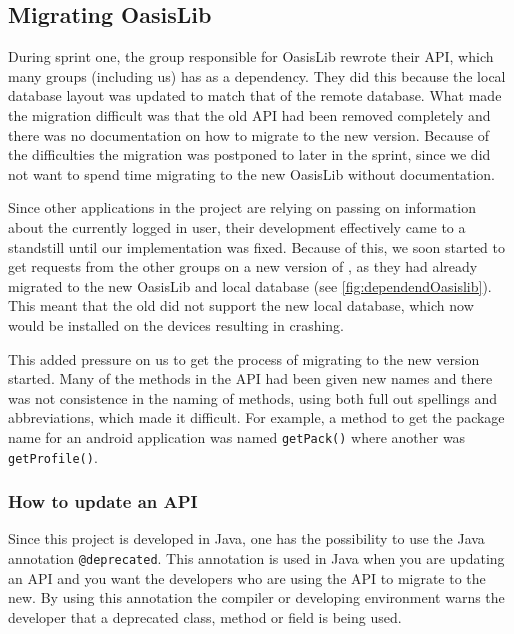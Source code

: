 
\subsection{Migrating OasisLib}\label{sec:oasismigration}
During sprint one, the group responsible for OasisLib rewrote their API, which many groups (including us) has as a dependency.
They did this because the local database layout was updated to match that of the remote database.
What made the migration difficult was that the old API had been removed completely and there was no documentation on how to migrate to the new version.
Because of the difficulties the migration was postponed to later in the sprint, since we did not want to spend time migrating to the new OasisLib without documentation.

Since other applications in the \giraf project are relying on \launcher passing on information about the currently logged in user, their development effectively came to a standstill until our implementation was fixed.
Because of this, we soon started to get requests from the other groups on a new version of \launcher, as they had already migrated to the new OasisLib and local database (see \cref{fig:dependendOasislib}).
This meant that the old \launcher did not support the new local database, which now would be installed on the devices resulting in \launcher crashing.


This added pressure on us to get the process of migrating to the new version started.
Many of the methods in the API had been given new names and there was not consistence in the naming of methods, using both full out spellings and abbreviations, which made it difficult.
For example, a method to get the package name for an android application was named \lstinline{getPack()} where another was \lstinline{getProfile()}.

\subsubsection{How to update an API}
Since this project is developed in Java, one has the possibility to use the Java annotation \lstinline{@deprecated}.
This annotation is used in Java when you are updating an API and you want the developers who are using the API to migrate to the new.
By using this annotation the compiler or developing environment warns the developer that a deprecated class, method or field is being used.

